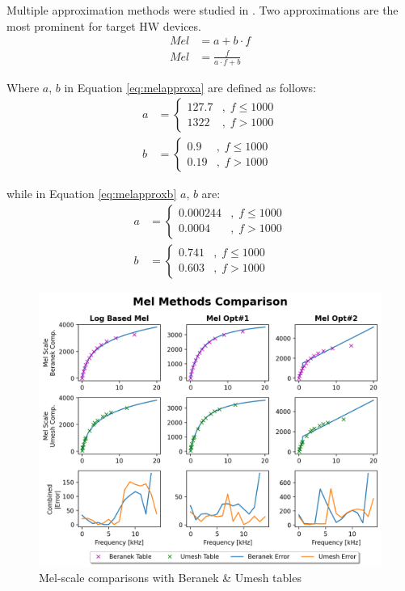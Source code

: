 Multiple approximation methods were studied in \cite{fitmelscale}.
Two approximations are the most prominent for target HW devices.
\begin{align}
    \label{eq:melapproxa} Mel & = a + b \cdot f \\ 
    Mel & = \frac{f}{a \cdot f + b} \label{eq:melapproxb}
\end{align}

Where \(a\), \(b\) in Equation \ref{eq:melapproxa} are defined as follows:
\begin{align}
    a & = \begin{cases}
        127.7   &,\;f \leq 1000 \\
        1322    &,\;f > 1000
    \end{cases} \nonumber \\
    b & = \begin{cases}
        0.9     &,\;f \leq 1000 \\
        0.19    &,\;f > 1000
    \end{cases}
\end{align}

while in Equation \ref{eq:melapproxb} \(a\), \(b\) are:
\begin{align}
    a & = \begin{cases}
        0.000244   &,\;f \leq 1000 \\
        0.0004    &,\;f > 1000
    \end{cases} \nonumber \\
    b & = \begin{cases}
        0.741   &,\;f \leq 1000 \\
        0.603   &,\;f > 1000
    \end{cases}
\end{align}

\begin{figure}[H]
    \centering
    \includegraphics[width=\linewidth]{Scaling/images/mel_methods_comp}
    \caption{Mel-scale comparisons with Beranek \& Umesh tables}\label{fig:mel_methods_comp}
\end{figure}

